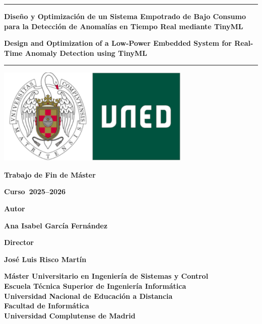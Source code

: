 \documentclass[11pt,a4paper]{book}
\newcommand{\miAutor}{Ana Isabel García Fernández}
\newcommand{\miDirector}{José Luis Risco Martín}
\newcommand{\miTituloES}{Diseño y Optimización de un Sistema Empotrado de Bajo Consumo para la Detección de Anomalías en Tiempo Real mediante TinyML}
\newcommand{\miTituloEN}{Design and Optimization of a Low-Power Embedded System for Real-Time Anomaly Detection using TinyML}
\newcommand{\miTFX}{Trabajo de Fin de Máster}
\newcommand{\miCurso}{2025--2026}
\newcommand{\misEstudios}{Máster Universitario en Ingeniería de Sistemas y Control}
\begin{document}
\frontmatter

\begin{titlepage}
\centering

\vspace*{1.75cm}

\rule{12cm}{1pt}

{\Large \textbf{\miTituloES} \par}
{\Large \textbf{\miTituloEN} \par} 

\rule{12cm}{1pt}

\vspace{0.75cm}
\includegraphics[width=9.25cm]{core/logo_misc.png}
\vspace{0.75cm}

{\Large \textbf{\miTFX}} \\
{\Large \textbf{Curso~\miCurso} \par}

\vspace{1cm}
\vfill

{\Large \textbf{Autor}} \\
{\large \textbf{\miAutor} \par}

\vspace{0.25cm}

{\Large \textbf{Director}} \\
{\large \textbf{\miDirector} \par}

\vspace{0.25cm}

{\large \textbf{\misEstudios}}\\
{\large \textbf{Escuela Técnica Superior de Ingeniería Informática}}\\
{\large \textbf{Universidad Nacional de Educación a Distancia}}\\
{\large \textbf{Facultad de Informática}}\\
{\large \textbf{Universidad Complutense de Madrid}}

\end{titlepage}
\end{document}
